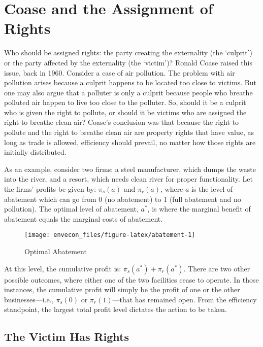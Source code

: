 \documentclass[
]{book}
\begin{document}
\hypertarget{coase-and-the-assignment-of-rights}{%
\section{Coase and the Assignment of Rights}\label{coase-and-the-assignment-of-rights}}

Who should be assigned rights: the party creating the externality (the `culprit') or the party affected by the externality (the `victim')? Ronald Coase raised this issue, back in 1960. Consider a case of air pollution. The problem with air pollution arises because a culprit happens to be located too close to victims. But one may also argue that a polluter is only a culprit because people who breathe polluted air happen to live too close to the polluter. So, should it be a culprit who is given the right to pollute, or should it be victims who are assigned the right to breathe clean air? Coase's conclusion was that because the right to pollute and the right to breathe clean air are property rights that have value, as long as trade is allowed, efficiency should prevail, no matter how those rights are initially distributed.

As an example, consider two firms: a steel manufacturer, which dumps the waste into the river, and a resort, which needs clean river for proper functionality. Let the firms' profits be given by: \(\pi_s(a)\) and \(\pi_r(a)\), where \(a\) is the level of abatement which can go from 0 (no abatement) to 1 (full abatement and no pollution). The optimal level of abatement, \(a^*\), is where the marginal benefit of abatement equals the marginal costs of abatement.

\begin{figure}

{\centering \texttt{[image: envecon\_files/figure-latex/abatement-1]} 

}

\caption{Optimal Abatement}\label{fig:abatement}
\end{figure}

At this level, the cumulative profit is: \(\pi_s(a^*)+\pi_r(a^*)\). There are two other possible outcomes, where either one of the two facilities cease to operate. In those instances, the cumulative profit will simply be the profit of one or the other businesses---i.e., \(\pi_s(0)\) or \(\pi_r(1)\)---that has remained open. From the efficiency standpoint, the largest total profit level dictates the action to be taken.

\hypertarget{the-victim-has-rights}{%
\subsection{The Victim Has Rights}\label{the-victim-has-rights}}
\end{document}
